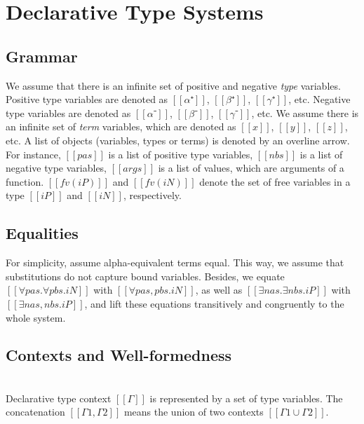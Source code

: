 \documentclass[a4,natbib=false]{article}
\begin{document}
\tableofcontents

\newpage

\section{Declarative Type Systems}

\subsection{Grammar}
We assume that there is an infinite set of positive and 
negative \emph{type} variables. Positive type variables are denoted as 
$[[α⁺]]$, $[[β⁺]]$, $[[γ⁺]]$, etc.
Negative type variables are denoted as $[[α⁻]]$, $[[β⁻]]$, $[[γ⁻]]$, etc.
We assume there is an infinite set of \emph{term} variables,
which are denoted as $[[x]]$, $[[y]]$, $[[z]]$, etc.
A list of objects (variables, types or terms) is denoted by
an overline arrow. For instance, $[[pas]]$ is a list of positive type variables, 
$[[nbs]]$ is a list of negative type variables, 
$[[args]]$ is a list of values, which are arguments of a function.
$[[fv(iP)]]$ and $[[fv(iN)]]$ denote the set of free variables 
in a type $[[iP]]$ and $[[iN]]$, respectively.


\bigskip

\ottgrammartabular{
  \ottiP\ottinterrule
  \ottiN\ottinterrule
}

\subsection{Equalities}
For simplicity, assume alpha-equivalent terms equal. 
This way, we assume that substitutions do not capture bound variables.
Besides, we equate
$[[∀pas.∀pbs.iN]]$ with $[[∀pas,pbs.iN]]$, 
as well as $[[∃nas.∃nbs.iP]]$ with $[[∃nas,nbs.iP]]$,
and lift these equations transitively and congruently 
to the whole system.

\subsection{Contexts and Well-formedness}

\begin{definition}
  \hfill \\
  Declarative type context $[[Γ]]$ is represented by a set of 
  type variables. The concatenation $[[Γ1, Γ2]]$ means the 
  union of two contexts $[[Γ1 ∪ Γ2]]$.
\end{definition}
\end{document}
